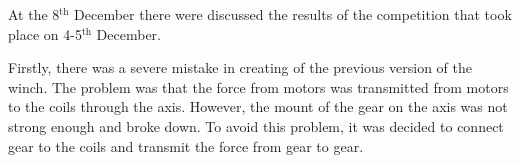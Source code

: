 \begin{enumerate*}
\begin{figure}[H]
\begin{minipage}[h]{0.31\linewidth}
  		\caption{}
  	\end{minipage}
  	\hfill
  	\begin{minipage}[h]{0.31\linewidth}
  		\caption{}
  	\end{minipage}
  \end{figure}

  \item At the 8$^\text{th}$ December there were discussed the results of the competition that took place on 4-5$^\text{th}$ December.
  \begin{enumerate*}
  	
  	\item Firstly, there was a severe mistake in creating of the previous version of the winch. The problem was that the force from motors was transmitted from motors to the coils through the axis. However, the mount of the gear on the axis was not strong enough and broke down. To avoid this problem, it was decided to connect gear to the coils and transmit the force from gear to gear.
  	

\end{enumerate*}
\end{enumerate*}
